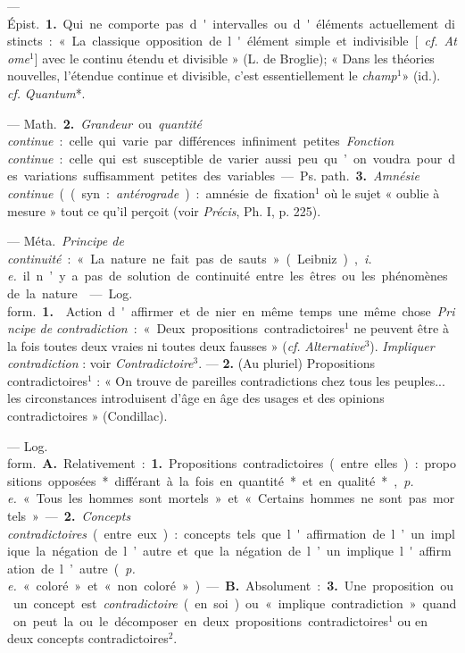 \begin{itemize}[leftmargin=1cm, label=, itemsep=11pt]
 — \si{Épist.} {\bf 1.} Qui ne comporte
pas d'intervalles ou d'éléments
actuellement distincts : « La classique
opposition de l'élément simple
et indivisible [{\it cf.} {\it Atome}$^1$] avec le
continu étendu et divisible » (L. de
Broglie); « Dans les théories nouvelles, l'étendue continue et divisible, c'est essentiellement le {\it champ}$^1$»
(id.). {\it cf.} {\it Quantum}*.

— \si{Math.} {\bf 2.} {\it Grandeur} ou {\it quantité
continue} : celle qui varie par différences infiniment petites. {\it Fonction
continue} : celle qui est susceptible de
varier aussi peu qu’on voudra pour
des variations suffisamment petites
des variables.

— \si{Ps. path.} {\bf 3.} {\it Amnésie continue}
((syn. : {\it antérograde}) : amnésie de
fixation$^1$ où le sujet « oublie à mesure » tout ce qu'il perçoit (voir
 {\it Précis}, Ph. I, p. 225).

 — \si{Méta.} {\it Principe de continuité} : « La nature ne fait pas de
sauts » (Leibniz), {\it i. e.} il n’y a pas de
solution de continuité entre les êtres
ou les phénomènes de la nature.

 — \si{Log. form.} {\bf 1.} 
Action d'affirmer et de nier en même
temps une même chose. {\it Principe de
contradiction} : « Deux propositions
contradictoires$^1$ ne peuvent être à la
fois toutes deux vraies ni toutes deux
fausses » ({\it cf.} {\it Alternative}$^3$). {\it Impliquer contradiction} : voir {\it Contradictoire}$^3$. — {\bf 2.}  (Au pluriel) Propositions contradictoires$^1$ : « On trouve
de pareilles contradictions chez
tous les peuples... les circonstances
introduisent d'âge en âge des usages
et des opinions contradictoires »
(Condillac).

 — \si{Log. form.} {\bf A.} Relativement : {\bf 1.} Propositions contradictoires (entre elles) : propositions
opposées* différant à la fois en
quantité* et en qualité*, {\it p. e.} « Tous
les hommes sont mortels » et « Certains hommes ne sont pas mortels ».

— {\bf 2.} {\it Concepts contradictoires} (entre
eux) : concepts tels que l'affirmation
de l’un implique la négation de
l’autre et que la négation de l’un
implique l'affirmation de l’autre
({\it p. e.} « coloré » et « non coloré »). —
{\bf B.} Absolument : {\bf 3.} Une proposition
ou un concept est {\it contradictoire} (en
soi) ou « implique contradiction »
quand on peut la ou le décomposer
en deux propositions contradictoires$^1$ ou en deux concepts contradictoires$^2$.


\end{itemize}
